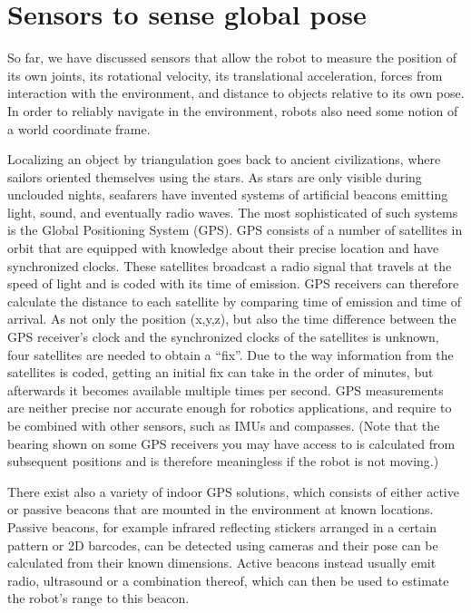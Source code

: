 \section{Sensors to sense global pose}
So far, we have discussed sensors that allow the robot to measure the position of its own joints,  its rotational velocity, its translational acceleration, forces from interaction with the environment, and distance to objects relative to its own pose. In order to reliably navigate in the environment, robots also need some notion of a world coordinate frame.  

Localizing an object by triangulation goes back to ancient civilizations, where sailors oriented themselves using the stars. As stars are only visible during unclouded nights, seafarers have invented systems of artificial beacons emitting light, sound, and eventually radio waves. The most sophisticated of such systems is the Global Positioning System (GPS). GPS consists of a number of satellites in orbit that are equipped with knowledge about their precise location and have synchronized clocks. These satellites broadcast a radio signal that travels at the speed of light and is coded with its time of emission. GPS receivers can therefore calculate the distance to each satellite by comparing time of emission and time of arrival. As not only the position (x,y,z), but also the time difference between the GPS receiver's clock and the synchronized clocks of the satellites is unknown, four satellites are needed to obtain a ``fix''. Due to the way information from the satellites is coded, getting an initial fix can take in the order of minutes, but afterwards it becomes available multiple times per second. GPS measurements are neither precise nor accurate enough for robotics applications, and require to be combined with other sensors, such as IMUs and compasses. (Note that the bearing shown on some GPS receivers you may have access to is calculated from subsequent positions and is therefore meaningless if the robot is not moving.)

There exist also a variety of indoor GPS solutions, which consists of either active or passive beacons that are mounted in the environment at known locations. Passive beacons, for example infrared reflecting stickers arranged in a certain pattern or 2D barcodes, can be detected using cameras and their pose can be calculated from their known dimensions. Active beacons instead usually emit radio, ultrasound or a combination thereof, which can then be used to estimate the robot's range to this beacon.

